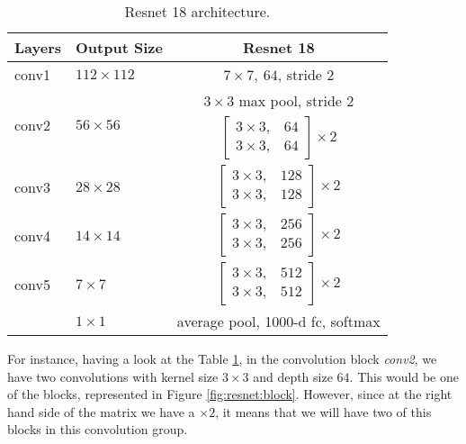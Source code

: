 \begin{table}[H]
    \label{arch:resnet:18}
    \centering
    \begin{tabular}{l|l|c}
    \hline
    Layers                      & Output Size                     & Resnet 18                                                                     \\ \hline
    conv1                    & $112\times112$                  & $7 \times 7, \ 64$, stride 2                                                  \\ \hline
    \multirow{2}{*}{conv2} & \multirow{2}{*}{$56 \times 56$} & $3 \times 3$ max pool, stride 2                                               \\ \cline{3-3} 
                                &                                 & $\begin{bmatrix}3 \times 3 , & 64 \\ 3 \times 3,& 64 \end{bmatrix} \times 2$  \\ \hline
    conv3                  & $28 \times 28$                  & $\begin{bmatrix} 3\times 3, & 128 \\ 3\times 3, & 128 \end{bmatrix} \times 2$ \\ \hline
    conv4                  & $14 \times 14$                  & $\begin{bmatrix} 3\times 3, & 256\\ 3\times 3, & 256\end{bmatrix} \times 2$   \\ \hline
    conv5                  & $7 \times 7$                    & $\begin{bmatrix} 3\times 3, & 512\\ 3\times 3, & 512\end{bmatrix} \times 2$   \\ \hline
                                & $1\times 1 $                    & average pool, 1000-d fc, softmax                                              \\ \hline
    \end{tabular}
    \caption{Resnet 18 architecture.}
    \end{table}

For instance, having a look at the Table \ref{arch:resnet:18}, in the convolution block \emph{conv2}, we have two convolutions with kernel size $3\times 3$ and depth size $64$. This would be one of the blocks, represented in Figure \ref{fig:resnet:block}. However, since at the right hand side of the matrix we have a $\times 2$, it means that we will have two of this blocks in this convolution group.

